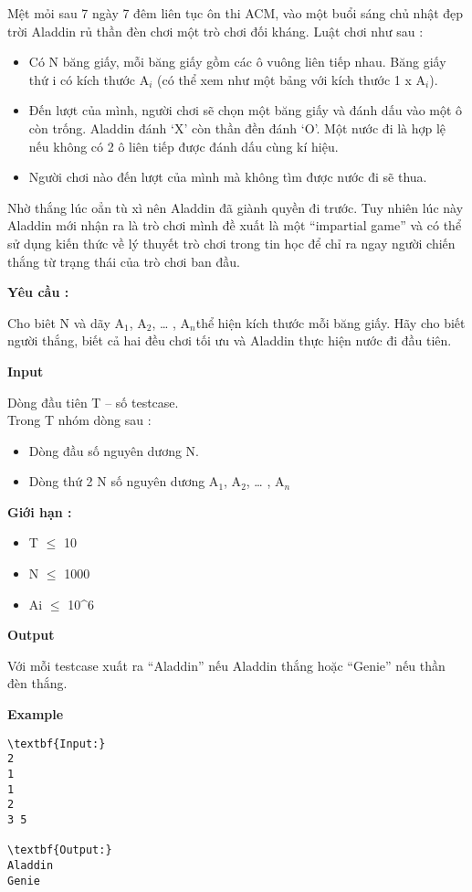 

Mệt mỏi sau 7 ngày 7 đêm liên tục ôn thi ACM, vào một buổi sáng chủ nhật đẹp trời Aladdin rủ thần đèn chơi một trò chơi đối kháng. Luật chơi như sau :
\begin{itemize}
	\item Có N băng giấy, mỗi băng giấy gồm các ô vuông liên tiếp nhau. Băng giấy thứ i có kích thước A$_i$ (có thể xem như một bảng với kích thước 1 x A$_i$).
	\item Đến lượt của mình, người chơi sẽ chọn một băng giấy và đánh dấu vào một ô còn trống. Aladdin đánh ‘X’ còn thần đền đánh ‘O’. Một nước đi là hợp lệ nếu không có 2 ô liên tiếp được đánh dấu cùng kí hiệu.
	\item Người chơi nào đến lượt của mình mà không tìm được nước đi sẽ thua.
\end{itemize}

Nhờ thắng lúc oẳn tù xì nên Aladdin đã giành quyền đi trước. Tuy nhiên lúc này Aladdin mới nhận ra là trò chơi mình đề xuất là một “impartial game” và có thể sử dụng kiến thức về lý thuyết trò chơi trong tin học để chỉ ra ngay người chiến thắng từ trạng thái của trò chơi ban đầu.

\textbf{Yêu cầu :}

Cho biêt N và dãy A$_1$, A$_2$, … , A$_n $thể hiện kích thước mỗi băng giấy. Hãy cho biết người thắng, biết cả hai đều chơi tối ưu và Aladdin thực hiện nước đi đầu tiên.

\textbf{Input}

Dòng đầu tiên T – số testcase.
\\Trong T nhóm dòng sau :
\begin{itemize}
	\item Dòng đầu số nguyên dương N.
	\item Dòng thứ 2 N số nguyên dương A$_1$, A$_2$, … , A$_n$
\end{itemize}

\textbf{Giới hạn : }
\begin{itemize}
	\item T  $\le$  10
	\item N  $\le$  1000
	\item Ai  $\le$  10\textasciicircum6
\end{itemize}

\textbf{Output}

Với mỗi testcase xuất ra “Aladdin” nếu Aladdin thắng hoặc “Genie” nếu thần đèn thắng.

\textbf{Example}
\begin{verbatim}
\textbf{Input:}
2
1
1
2
3 5

\textbf{Output:}
Aladdin
Genie\end{verbatim}
